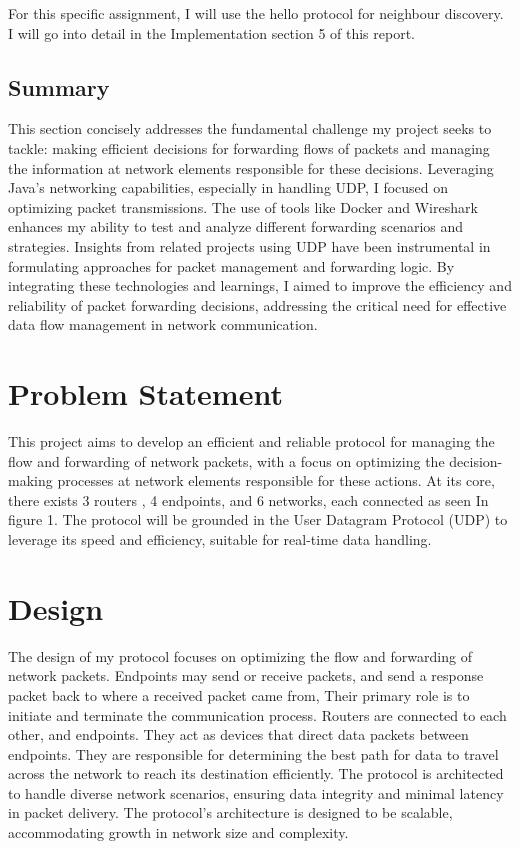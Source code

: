 \documentclass{article}
\begin{document}
For this specific assignment, I will use the hello protocol for neighbour discovery. I will go into detail in the Implementation section 5 of this report.


\subsection{Summary}

This section concisely addresses the fundamental challenge my project seeks to tackle: making efficient decisions for forwarding flows of packets and managing the information at network elements responsible for these decisions. Leveraging Java's networking capabilities, especially in handling UDP, I focused on optimizing packet transmissions. The use of tools like Docker and Wireshark enhances my ability to test and analyze different forwarding scenarios and strategies. Insights from related projects using UDP have been instrumental in formulating approaches for packet management and forwarding logic. By integrating these technologies and learnings, I aimed to improve the efficiency and reliability of packet forwarding decisions, addressing the critical need for effective data flow management in network communication.


\section{Problem Statement}
\label{sec:ProblemStatement}

This project aims to develop an efficient and reliable protocol for managing the flow and forwarding of network packets, with a focus on optimizing the decision-making processes at network elements responsible for these actions. At its core, there exists 3 routers , 4 endpoints, and 6 networks, each connected as seen In figure 1. The protocol will be grounded in the User Datagram Protocol (UDP) to leverage its speed and efficiency, suitable for real-time data handling.


\section{Design}
\label{sec:Design}

The design of my protocol focuses on optimizing the flow and forwarding of network packets. Endpoints may send or receive packets, and send a response packet back to where a received packet came from, Their primary role is to initiate and terminate the communication process. Routers are connected to each other, and endpoints. They act as devices that direct data packets between endpoints. They are responsible for determining the best path for data to travel across the network to reach its destination efficiently. The protocol is architected to handle diverse network scenarios, ensuring data integrity and minimal latency in packet delivery. The protocol’s architecture is designed to be scalable, accommodating growth in network size and complexity. 
\end{document}
